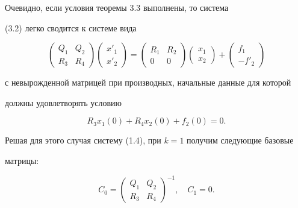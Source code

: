\begin{notes} 


Очевидно, если условия теоремы 3.3 выполнены, то система 


(3.2) легко сводится к системе вида 


$$ 


\begin{pmatrix}Q_1 & Q_2 \\ R_3 & R_4 \end{pmatrix} 


\begin{pmatrix}x'_1 \\ x'_2 \end{pmatrix}= 


\begin{pmatrix}R_1 & R_2 \\ 0 & 0 \end{pmatrix} 


\begin{pmatrix}x_1 \\ x_2 \end{pmatrix}+ 


\begin{pmatrix}f_1 \\ -f'_2 \end{pmatrix} 


$$ 


с невырожденной матрицей при производных, начальные данные для которой 


должны удовлетворять условию 


$$ 


R_3x_1(0)+R_4x_2(0)+f_2(0)=0. 


$$ 


 


Решая для этого случая систему (1.4), при $k=1$ получим следующие базовые 


матрицы: 


$$ 


C_0=\begin{pmatrix}Q_1 & Q_2 \\ R_3 & R_4 \end{pmatrix}^{-1},\quad 


C_1=0. 


$$ 


\end{notes} 


 


 



